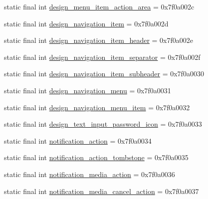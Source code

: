 \begin{DoxyCompactItemize}
\item 
static final int \mbox{\hyperlink{classandroid_1_1support_1_1design_1_1_r_1_1layout_a892f94461e21ef2384016ac479728ada}{design\+\_\+menu\+\_\+item\+\_\+action\+\_\+area}} = 0x7f0a002c
\item 
static final int \mbox{\hyperlink{classandroid_1_1support_1_1design_1_1_r_1_1layout_a6f870feafd3976058e65635845afdf28}{design\+\_\+navigation\+\_\+item}} = 0x7f0a002d
\item 
static final int \mbox{\hyperlink{classandroid_1_1support_1_1design_1_1_r_1_1layout_ad5d1e4411a5d259439aaeb5d66ee87e4}{design\+\_\+navigation\+\_\+item\+\_\+header}} = 0x7f0a002e
\item 
static final int \mbox{\hyperlink{classandroid_1_1support_1_1design_1_1_r_1_1layout_ad96876f67d154d3fd08794c12c1efc59}{design\+\_\+navigation\+\_\+item\+\_\+separator}} = 0x7f0a002f
\item 
static final int \mbox{\hyperlink{classandroid_1_1support_1_1design_1_1_r_1_1layout_a3d4b46f5c32b100f48b1cf108d0f5b68}{design\+\_\+navigation\+\_\+item\+\_\+subheader}} = 0x7f0a0030
\item 
static final int \mbox{\hyperlink{classandroid_1_1support_1_1design_1_1_r_1_1layout_a68f5d00d1b2b0dbca3b4c40fcc85bd25}{design\+\_\+navigation\+\_\+menu}} = 0x7f0a0031
\item 
static final int \mbox{\hyperlink{classandroid_1_1support_1_1design_1_1_r_1_1layout_acd70ec67d761277f1107f9dd89bc96a3}{design\+\_\+navigation\+\_\+menu\+\_\+item}} = 0x7f0a0032
\item 
static final int \mbox{\hyperlink{classandroid_1_1support_1_1design_1_1_r_1_1layout_ac329dd259163afccb61adabe0e1087c3}{design\+\_\+text\+\_\+input\+\_\+password\+\_\+icon}} = 0x7f0a0033
\item 
static final int \mbox{\hyperlink{classandroid_1_1support_1_1design_1_1_r_1_1layout_a62682e26dd7458358a71436219e3b29d}{notification\+\_\+action}} = 0x7f0a0034
\item 
static final int \mbox{\hyperlink{classandroid_1_1support_1_1design_1_1_r_1_1layout_ad1470d8708bc64b9fa90688c9ba2e8b8}{notification\+\_\+action\+\_\+tombstone}} = 0x7f0a0035
\item 
static final int \mbox{\hyperlink{classandroid_1_1support_1_1design_1_1_r_1_1layout_ae4178499ed0a627b4082b09cfae99907}{notification\+\_\+media\+\_\+action}} = 0x7f0a0036
\item 
static final int \mbox{\hyperlink{classandroid_1_1support_1_1design_1_1_r_1_1layout_a2afa4dd43d64918dd43e5c1b6ee43b97}{notification\+\_\+media\+\_\+cancel\+\_\+action}} = 0x7f0a0037

\end{DoxyCompactItemize}
